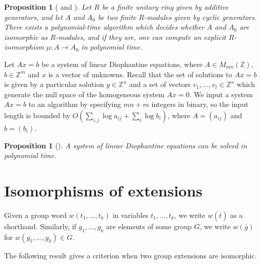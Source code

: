 \documentclass{article}
\newtheorem{proposition}[theorem]{Proposition}
\begin{document}
\begin{proposition}[{\cite[Theorem~1.1]{iuliana} and \cite[Proposition~3.1.7]{iuliana-thesis}}]\label{modiso}
	Let \( R \) be a finite unitary ring given by additive generators,
	and let \( A \) and \( A_0 \) be two finite \( R \)-modules given by cyclic generators.
	There exists a polynomial-time algorithm which decides whether \( A \) and \( A_0 \) are isomorphic as \( R \)-modules,
	and if they are, one can compute an explicit \( R \)-isomorphism \( \mu : A \to A_0 \) in polynomial time.
\end{proposition}

Let \( Ax = b \) be a system of linear Diophantine equations, where \( A \in M_{mn}(\mathbb{Z}) \), \( b \in \mathbb{Z}^m \)
and \( x \) is a vector of unknowns. Recall that the set of solutions to \( Ax = b \) is given by a particular solution \( y \in \mathbb{Z}^n \)
and a set of vectors \( v_1, \dots, v_t \in \mathbb{Z}^n \) which generate the null space of the homogeneous system \( Ax = 0 \).
We input a system \( Ax = b \) to an algorithm by specifying \( mn + m \) integers in binary, so the input length is bounded by
\( O(\sum_{i,j} \log a_{ij} + \sum_i \log b_i) \), where \( A = (a_{ij}) \) and \( b = (b_i) \).

\begin{proposition}[{\cite{dio1, dio2}}]\label{diosolve}
	A system of linear Diophantine equations can be solved in polynomial time.
\end{proposition}

\section{Isomorphisms of extensions}\label{siso}

Given a group word \( w(t_1, \dots, t_k) \) in variables \( t_1, \dots, t_k \), we write \( w(\overline{t}) \) as a shorthand.
Similarly, if \( g_1, \dots, g_k \) are elements of some group \( G \), we write \( w(\overline{g}) \) for \( w(g_1, \dots, g_k) \in G \).

The following result gives a criterion when two group extensions are isomorphic.
\end{document}
